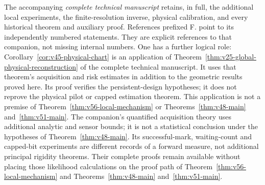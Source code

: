 The accompanying \emph{complete technical manuscript} retains, in full,
the additional local experiments, the finite-resolution inverse, physical
calibration, and every historical theorem and auxiliary proof.  References
prefixed \textup{F.} point to its independently numbered statements.
They are explicit references to that companion, not missing internal
numbers.  One has a further logical role:
Corollary~\ref{cor:v45-physical-chart} is an application of
Theorem~\ref{thm:v25-global-physical-reconstruction} of the complete
technical manuscript.  It uses that theorem's acquisition and risk
estimates in addition to the geometric results proved here.  Its proof
verifies the persistent-design hypotheses; it does not reprove the
physical pilot or capped estimation theorem.  This application is not
a premise of Theorem~\ref{thm:v56-local-mechanism} or
Theorems~\ref{thm:v48-main} and~\ref{thm:v51-main}.
The companion's quantified acquisition theory uses additional
analytic and sensor bounds; it is not a statistical conclusion under the
hypotheses of Theorem~\ref{thm:v48-main}.  Its successful-mark, waiting-count
and capped-bit experiments are different records of a forward measure,
not additional principal rigidity theorems.  Their complete proofs remain
available without placing those likelihood calculations on the proof
path of Theorem~\ref{thm:v56-local-mechanism} and Theorems~\ref{thm:v48-main} and~\ref{thm:v51-main}.
